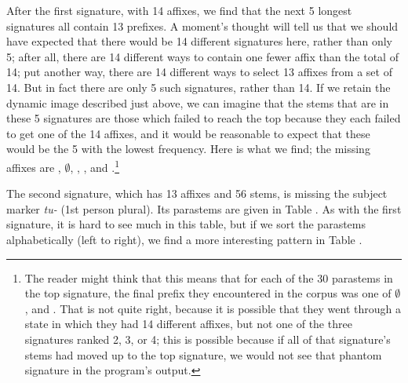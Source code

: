 \documentclass[output=paper,colorlinks,citecolor=brown]{langscibook}
\begin{document}
 
 
After the first signature, with 14 affixes, we find that the next 5 longest signatures all contain 13 prefixes. A moment's thought will tell us that we should have expected that there would be 14 different signatures here, rather than only 5; after all, there are 14 different ways to contain one fewer affix than the total of 14; put another way, there are 14 different ways to select 13 affixes from a set of 14. But in fact there are only 5 such signatures, rather than 14. If we retain the dynamic image described just above, we can imagine that the stems that are in these 5 signatures are those which failed to reach the top because they each failed to get one of the 14 affixes, and it would be reasonable to expect that these would be the 5 with the lowest frequency. Here is what we find; the missing affixes are \textit{}, $\emptyset$, \textit{}, \textit{}, and \textit{}.\footnote{The reader might think that this means that for each of the 30 parastems in the top signature, the final prefix they encountered in the corpus was one of $\emptyset$, \textit{} and \textit{}. That is not quite right, because it is possible that they went through a state in which they had 14 different affixes, but not one of the three signatures ranked 2, 3, or 4; this is possible because if all of that signature's stems had moved up to the top signature, we would not see that phantom signature in the program's output.}  
  
The second signature, which has 13 affixes and 56 stems, is missing the subject marker \textit{tu-} (1st person plural). Its parastems are given in Table . As with the first signature, it is hard to see much in this table, but if we sort the parastems alphabetically (left to right), we find a more interesting pattern in Table .
\end{document}
